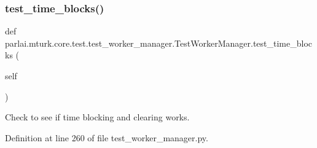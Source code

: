 \subsubsection{\texorpdfstring{test\+\_\+time\+\_\+blocks()}{test\_time\_blocks()}}
{\footnotesize\ttfamily def parlai.\+mturk.\+core.\+test.\+test\+\_\+worker\+\_\+manager.\+Test\+Worker\+Manager.\+test\+\_\+time\+\_\+blocks (\begin{DoxyParamCaption}\item[{}]{self }\end{DoxyParamCaption})}

\begin{DoxyVerb}Check to see if time blocking and clearing works.
\end{DoxyVerb}
 

Definition at line 260 of file test\+\_\+worker\+\_\+manager.\+py.


